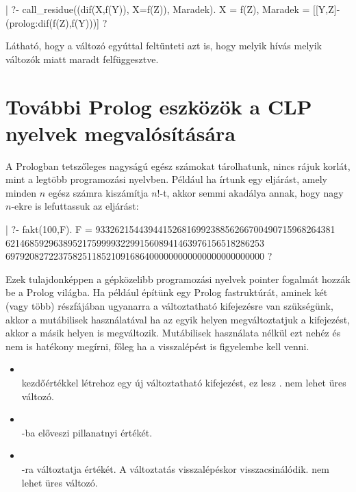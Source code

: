 \begin{prologcode}
| ?- call_residue((dif(X,f(Y)), X=f(Z)), Maradek).
X = f(Z),
Maradek = [[Y,Z]-(prolog:dif(f(Z),f(Y)))] ?
\end{prologcode}

Látható, hogy a  változó egyúttal feltünteti azt is, hogy melyik
hívás melyik változók miatt maradt felfüggesztve.

\section{További Prolog eszközök a CLP nyelvek megvalósítására}

A Prologban tetszőleges nagyságú egész számokat tárolhatunk, nincs rájuk
korlát, mint a legtöbb programozási nyelvben. Például ha írtunk egy
 eljárást, amely minden $n$ egész számra kiszámítja $n!$-t, akkor
semmi akadálya annak, hogy nagy $n$-ekre is lefuttassuk az eljárást:

\begin{prologcode}
| ?- fakt(100,F).
F = 93326215443944152681699238856266700490715968264381
621468592963895217599993229915608941463976156518286253
697920827223758251185210916864000000000000000000000000 ? 
\end{prologcode}


Ezek tulajdonképpen a gépközelibb programozási nyelvek pointer
fogalmát hozzák be a Prolog világba. Ha például építünk egy
Prolog fastruktúrát, aminek két (vagy több) részfájában
ugyanarra a változtatható kifejezésre van szükségünk, akkor a
mutábilisek használatával ha az egyik helyen megváltoztatjuk a
kifejezést, akkor a másik helyen is megváltozik. Mutábilisek
használata nélkül ezt nehéz és nem is hatékony megírni, főleg
ha a visszalépést is figyelembe kell venni.

\begin{itemize}
\item {} \\
 kezdőértékkel létrehoz egy új változtatható kifejezést,
ez lesz .  nem lehet üres változó.

\item {} \\
-ba előveszi  pillanatnyi értékét.

\item {} \\
-ra változtatja  értékét. A változtatás visszalépéskor
visszacsinálódik.  nem lehet üres változó.
\end{itemize}

